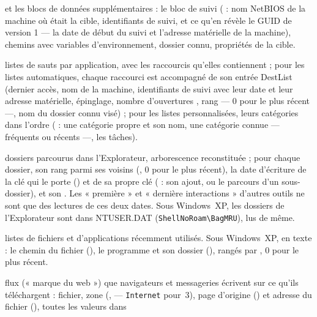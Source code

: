\documentclass[11pt,a4paper,oneside]{report}
\begin{document}
\begin{description}[style=nextline,leftmargin=1.2em]
        et les blocs de données supplémentaires : le bloc de suivi
        ( : nom NetBIOS de la machine où était la cible,
        identifiants de suivi, et ce qu'en révèle le GUID de version 1 — la date
        de début du suivi et l'adresse matérielle de la machine), chemins avec
        variables d'environnement, dossier connu, propriétés de la cible.
  \item[\fichier{jumplistAutomaticDestinations.json},
        \fichier{jumplistCustomDestinations.json}] listes de sauts par
        application, avec les raccourcis qu'elles contiennent ; pour les listes
        automatiques, chaque raccourci est accompagné de son entrée DestList
        (dernier accès, nom de la machine, identifiants de suivi avec leur date
        et leur adresse matérielle, épinglage, nombre d'ouvertures
        , rang  — 0 pour le plus
        récent —, nom du dossier connu visé) ; pour les listes personnalisées,
        leurs catégories dans l'ordre ( : une catégorie
        propre et son nom, une catégorie connue — fréquents ou récents —, les
        tâches).
  \item[\fichier{shellbags.json}] dossiers parcourus dans l'Explorateur,
        arborescence reconstituée ; pour chaque dossier, son rang parmi ses
        voisins (, 0 pour le plus récent), la date d'écriture
        de la clé qui le porte () et de sa propre clé
        ( : son ajout, ou le parcours d'un sous-dossier),
        et son . Les « première » et « dernière interactions »
        d'autres outils ne sont que des lectures de ces deux dates. Sous
        Windows~XP, les dossiers de l'Explorateur sont dans NTUSER.DAT
        (\texttt{ShellNoRoam\textbackslash BagMRU}), lus de même.
  \item[\fichier{mrus.json}, \fichier{mruApps.json}] listes de fichiers et
        d'applications récemment utilisés. Sous Windows~XP, en texte : le chemin
        du fichier (), le programme et son dossier (),
        rangés par , 0 pour le plus récent.
  \item[\fichier{zone\_identifiers.json}] flux 
        (« marque du web ») que navigateurs et messageries écrivent sur ce qu'ils
        téléchargent : fichier, zone (,  —
        \texttt{Internet} pour~3), page d'origine () et
        adresse du fichier (), toutes les valeurs dans

\end{description}
\end{document}
